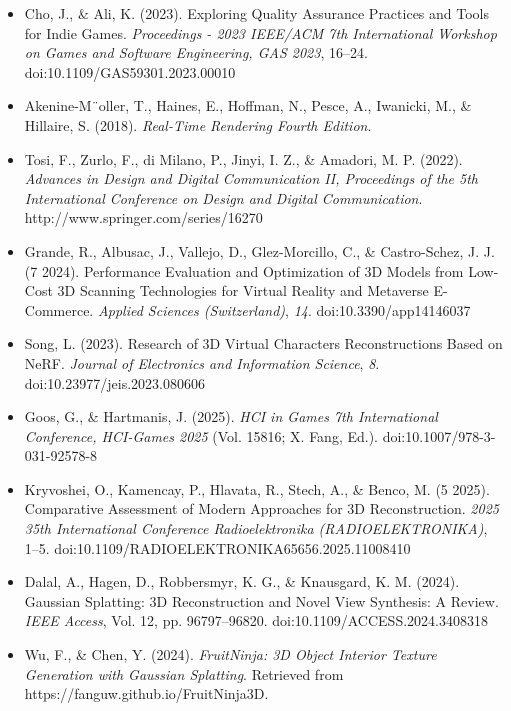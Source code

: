 \begin{itemize}
    \item Cho, J., \& Ali, K. (2023). Exploring Quality Assurance Practices and Tools for Indie Games. \textit{Proceedings - 2023 IEEE/ACM 7th International Workshop on Games and Software Engineering, GAS 2023}, 16–24. doi:10.1109/GAS59301.2023.00010

    \item Akenine-M¨oller, T., Haines, E., Hoﬀman, N., Pesce, A., Iwanicki, M., \& Hillaire, S. (2018). \textit{Real-Time Rendering Fourth Edition}.

    \item Tosi, F., Zurlo, F., di Milano, P., Jinyi, I. Z., \& Amadori, M. P. (2022). \textit{Advances in Design and Digital Communication II, Proceedings of the 5th International Conference on Design and Digital Communication}. http://www.springer.com/series/16270

    \item Grande, R., Albusac, J., Vallejo, D., Glez-Morcillo, C., \& Castro-Schez, J. J. (7 2024). Performance Evaluation and Optimization of 3D Models from Low-Cost 3D Scanning Technologies for Virtual Reality and Metaverse E-Commerce. \textit{Applied Sciences (Switzerland)}, \textit{14}. doi:10.3390/app14146037

    \item Song, L. (2023). Research of 3D Virtual Characters Reconstructions Based on NeRF. \textit{Journal of Electronics and Information Science}, \textit{8}. doi:10.23977/jeis.2023.080606

    \item Goos, G., \& Hartmanis, J. (2025). \textit{HCI in Games 7th International Conference, HCI-Games 2025} (Vol. 15816; X. Fang, Ed.). doi:10.1007/978-3-031-92578-8

    \item Kryvoshei, O., Kamencay, P., Hlavata, R., Stech, A., \& Benco, M. (5 2025). Comparative Assessment of Modern Approaches for 3D Reconstruction. \textit{2025 35th International Conference Radioelektronika (RADIOELEKTRONIKA)}, 1–5. doi:10.1109/RADIOELEKTRONIKA65656.2025.11008410

    \item Dalal, A., Hagen, D., Robbersmyr, K. G., \& Knausgard, K. M. (2024). Gaussian Splatting: 3D Reconstruction and Novel View Synthesis: A Review. \textit{IEEE Access}, Vol. 12, pp. 96797–96820. doi:10.1109/ACCESS.2024.3408318

    \item Wu, F., \& Chen, Y. (2024). \textit{FruitNinja: 3D Object Interior Texture Generation with Gaussian Splatting}. Retrieved from https://fanguw.github.io/FruitNinja3D.


\end{itemize}
